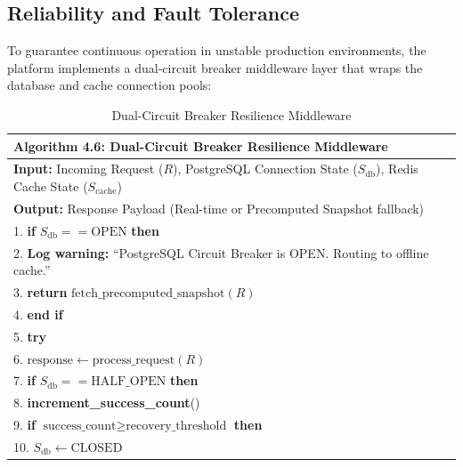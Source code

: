 \documentclass[12pt,a4paper]{report}
\theoremstyle{definition}
\theoremstyle{remark}
\begin{document}
\subsection{Reliability and Fault Tolerance}

To guarantee continuous operation in unstable production environments, the platform implements a dual-circuit breaker middleware layer that wraps the database and cache connection pools:
\begin{table}[htbp]
\centering
\caption{Dual-Circuit Breaker Resilience Middleware}
\label{alg:circuit_breaker}
\renewcommand{\arraystretch}{1.15}
\begin{tabular}{p{15cm}}
\toprule
\textbf{Algorithm 4.6: Dual-Circuit Breaker Resilience Middleware} \\
\midrule

\textbf{Input:} Incoming Request ($R$), PostgreSQL Connection State ($S_{\text{db}}$), Redis Cache State ($S_{\text{cache}}$) \\

\textbf{Output:} Response Payload (Real-time or Precomputed Snapshot fallback) \\

\midrule

1. \textbf{if} $S_{\text{db}} == \text{OPEN}$ \textbf{then} \\

2. \quad \textbf{Log warning:} ``PostgreSQL Circuit Breaker is OPEN. Routing to offline cache.'' \\

3. \quad \textbf{return} $\text{fetch\_precomputed\_snapshot}(R)$ \\

4. \textbf{end if} \\

5. \textbf{try} \\

6. \quad $\text{response} \leftarrow \text{process\_request}(R)$ \\

7. \quad \textbf{if} $S_{\text{db}} == \text{HALF\_OPEN}$ \textbf{then} \\

8. \quad\quad \textbf{increment\_success\_count}() \\

9. \quad\quad \textbf{if} $\text{success\_count} \geq \text{recovery\_threshold}$ \textbf{then} \\

10. \quad\quad\quad $S_{\text{db}} \leftarrow \text{CLOSED}$ \\


\end{tabular}
\end{table}
\end{document}
